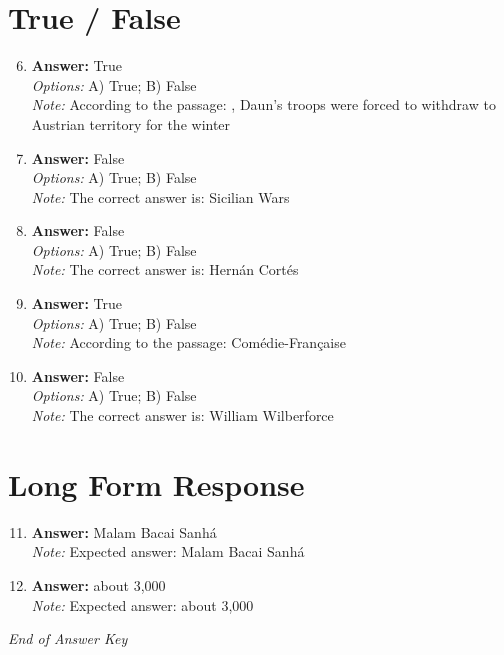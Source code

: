 \documentclass[12pt]{article}
\begin{document}
\section*{True / False}
\begin{enumerate}[label=\arabic*.]
\setcounter{enumi}{5}
\item \textbf{Answer:} True
\\ \textit{Options:} A) True; B) False
\\ \textit{Note:} According to the passage: , Daun's troops were forced to withdraw to Austrian territory for the winter
\item \textbf{Answer:} False
\\ \textit{Options:} A) True; B) False
\\ \textit{Note:} The correct answer is: Sicilian Wars
\item \textbf{Answer:} False
\\ \textit{Options:} A) True; B) False
\\ \textit{Note:} The correct answer is: Hernán Cortés
\item \textbf{Answer:} True
\\ \textit{Options:} A) True; B) False
\\ \textit{Note:} According to the passage: Comédie-Française
\item \textbf{Answer:} False
\\ \textit{Options:} A) True; B) False
\\ \textit{Note:} The correct answer is: William Wilberforce
\end{enumerate}

\section*{Long Form Response}
\begin{enumerate}[label=\arabic*.]
\setcounter{enumi}{10}
\item \textbf{Answer:} Malam Bacai Sanhá
\\ \textit{Note:} Expected answer: Malam Bacai Sanhá
\item \textbf{Answer:} about 3,000
\\ \textit{Note:} Expected answer: about 3,000
\end{enumerate}

\vfill
\noindent\textit{End of Answer Key}
\end{document}
